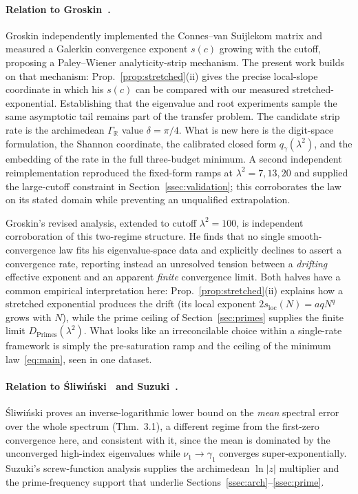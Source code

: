 \documentclass[11pt,a4paper]{article}
\begin{document}
\paragraph{Relation to Groskin~\cite{Groskin2026}.}
Groskin independently implemented the Connes--van Suijlekom matrix and measured
a Galerkin convergence exponent $s(c)$ growing with the cutoff, proposing a
Paley--Wiener analyticity-strip mechanism. The present work builds on that
mechanism: Prop.~\ref{prop:stretched}(ii) gives the precise local-slope
coordinate in which his $s(c)$ can be compared with our measured
stretched-exponential. Establishing that the eigenvalue and root experiments
sample the same asymptotic tail remains part of the transfer problem. The
candidate strip rate is the archimedean $\Gamma_\mathbb{R}$ value
$\delta=\pi/4$. What is new here is the digit-space
formulation, the Shannon coordinate, the calibrated closed form
$q_\gamma(\lambda^2)$, and the embedding of the rate in the full
three-budget minimum. A second independent reimplementation reproduced the
fixed-form ramps at $\lambda^2=7,13,20$ and supplied the large-cutoff
constraint in Section~\ref{ssec:validation}; this corroborates the law on its
stated domain while preventing an unqualified extrapolation.

Groskin's revised analysis, extended to cutoff $\lambda^2=100$, is independent
corroboration of this two-regime structure. He finds that no single
smooth-convergence law fits his eigenvalue-space data and explicitly declines to
assert a convergence rate, reporting instead an unresolved tension between a
\emph{drifting} effective exponent and an apparent \emph{finite} convergence
limit. Both halves have a common empirical interpretation here:
Prop.~\ref{prop:stretched}(ii) explains how a stretched exponential produces
the drift (its local exponent
$2s_{\mathrm{loc}}(N)=aqN^{q}$ grows with $N$), while the prime ceiling of
Section~\ref{sec:primes} supplies the finite limit $D_{\mathrm{Primes}}(\lambda^2)$.
What looks like an irreconcilable choice within a single-rate framework is simply
the pre-saturation ramp and the ceiling of the minimum law~\eqref{eq:main}, seen
in one dataset.

\paragraph{Relation to \'Sliwi\'nski~\cite{Sliwinski2026} and Suzuki~\cite{Suzuki2026}.}
\'Sliwi\'nski proves an inverse-logarithmic lower bound on the \emph{mean}
spectral error over the whole spectrum (Thm.~3.1), a different regime from the
first-zero convergence here, and consistent with it, since the mean is dominated
by the unconverged high-index eigenvalues while $\nu_1\to\gamma_1$ converges
super-exponentially. Suzuki's screw-function analysis supplies the archimedean
$\ln|z|$ multiplier and the prime-frequency support that underlie
Sections~\ref{ssec:arch}--\ref{ssec:prime}.
\end{document}
